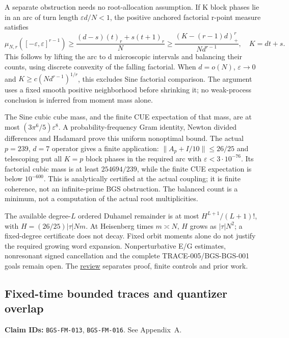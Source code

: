 A separate obstruction needs no root-allocation assumption. If K block
phases lie in an arc of turn length \(\varepsilon d/N<1\), the positive
anchored factorial r-point measure satisfies
\[
\mu_{N,r}([-\varepsilon,\varepsilon]^{r-1})
\ge\frac{(d-s)(t)_r+s(t+1)_r}{N}
\ge\frac{(K-(r-1)d)_+^r}{Nd^{r-1}},\quad K=dt+s.
\]
This follows by lifting the arc to d microscopic intervals and
balancing their counts, using discrete convexity of the falling factorial.
When \(d=o(N)\), \(\varepsilon\to0\) and
\(K\ge c(Nd^{r-1})^{1/r}\), this excludes Sine factorial comparison.
The argument uses a fixed smooth positive neighborhood before shrinking
it; no weak-process conclusion is inferred from moment mass alone.

The Sine cubic cube mass, and the finite CUE expectation of that mass,
are at most \((3\pi^6/5)\varepsilon^8\). A probability-frequency Gram
identity, Newton divided differences and Hadamard prove this uniform
nonoptimal bound. The actual \(p=239\), \(d=7\) operator gives a finite
application: \(\|A_p+I/10\|\le26/25\) and telescoping put all \(K=p\) block
phases in the required arc with \(\varepsilon<3\cdot10^{-76}\).
Its factorial cubic mass is at least \(254694/239\), while the finite
CUE expectation is below \(10^{-600}\). This is analytically certified
at the actual coupling; it is finite coherence, not an infinite-prime
BGS obstruction. The balanced count is a minimum, not a computation
of the actual root multiplicities.

The available degree-\(L\) ordered Duhamel remainder is at most
\(H^{L+1}/(L+1)!\), with \(H=(26/25)|\tau|Nm\). At Heisenberg times
\(m\asymp N\), \(H\) grows as \(|\tau|N^2\); a fixed-degree certificate
does not decay. Fixed orbit moments alone do not justify the required
growing word expansion. Nonperturbative E/G estimates, nonresonant
signed cancellation and the complete TRACE-005/BGS-BGS-001 goals
remain open. The \href{https://github.com/ChurilovMaksim/BGS/blob/main/archive/record/folded_quadratic_review_20261001.md}{review}
separates proof, finite controls and prior work.

\hypertarget{fixed-time-bounded-traces-and-quantizer-overlap}{%
\subsection{Fixed-time bounded traces and quantizer overlap}\label{fixed-time-bounded-traces-and-quantizer-overlap}}

\textbf{Claim IDs:} \texttt{BGS-FM-013}, \texttt{BGS-FM-016}. See Appendix~A.

